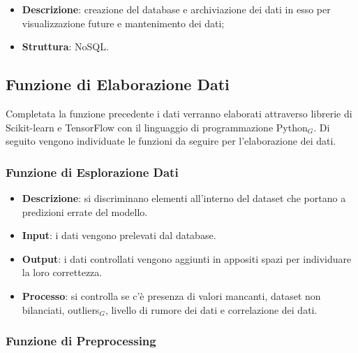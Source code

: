 \begin{itemize}
	\item \textbf{Descrizione}: creazione del database e archiviazione dei dati in esso per visualizzazione future e mantenimento dei dati;
	\item \textbf{Struttura}: NoSQL.
\end{itemize}


\subsection{Funzione di Elaborazione Dati}\label{}
Completata la funzione precedente i dati verranno elaborati attraverso librerie di Scikit-learn e TensorFlow con il linguaggio di programmazione Python$_G$.
Di seguito vengono individuate le funzioni da seguire per l'elaborazione dei dati.

\subsubsection{Funzione di Esplorazione Dati}\label{}

\begin{itemize}
	\item \textbf{Descrizione}: si discriminano elementi all'interno del dataset che portano a predizioni errate del modello.
	\item \textbf{Input}: i dati vengono prelevati dal database.
	\item \textbf{Output}: i dati controllati vengono aggiunti in appositi spazi per individuare la loro correttezza.
	\item \textbf{Processo}: si controlla se c'è presenza di valori mancanti, dataset non bilanciati, outliers$_G$, livello di rumore dei dati e correlazione dei dati.
\end{itemize}

\subsubsection{Funzione di Preprocessing}\label{}

